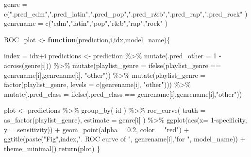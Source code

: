 \documentclass[
]{article}
\newenvironment{Shaded}{\begin{snugshade}}{\end{snugshade}}
\newcommand{\AttributeTok}[1]{\textcolor[rgb]{0.77,0.63,0.00}{#1}}
\newcommand{\ControlFlowTok}[1]{\textcolor[rgb]{0.13,0.29,0.53}{\textbf{#1}}}
\newcommand{\DecValTok}[1]{\textcolor[rgb]{0.00,0.00,0.81}{#1}}
\newcommand{\FloatTok}[1]{\textcolor[rgb]{0.00,0.00,0.81}{#1}}
\newcommand{\FunctionTok}[1]{\textcolor[rgb]{0.00,0.00,0.00}{#1}}
\newcommand{\NormalTok}[1]{#1}
\newcommand{\OtherTok}[1]{\textcolor[rgb]{0.56,0.35,0.01}{#1}}
\newcommand{\SpecialCharTok}[1]{\textcolor[rgb]{0.00,0.00,0.00}{#1}}
\newcommand{\StringTok}[1]{\textcolor[rgb]{0.31,0.60,0.02}{#1}}
\begin{document}
\begin{Shaded}
\begin{Highlighting}[]
\NormalTok{genre }\OtherTok{=} \FunctionTok{c}\NormalTok{(}\StringTok{".pred\_edm"}\NormalTok{,}\StringTok{".pred\_latin"}\NormalTok{,}\StringTok{".pred\_pop"}\NormalTok{,}\StringTok{".pred\_r\&b"}\NormalTok{,}\StringTok{".pred\_rap"}\NormalTok{,}\StringTok{".pred\_rock"}\NormalTok{ )}
\NormalTok{genrename }\OtherTok{=} \FunctionTok{c}\NormalTok{(}\StringTok{"edm"}\NormalTok{,}\StringTok{"latin"}\NormalTok{,}\StringTok{"pop"}\NormalTok{,}\StringTok{"r\&b"}\NormalTok{,}\StringTok{"rap"}\NormalTok{,}\StringTok{"rock"}\NormalTok{ )}

\NormalTok{ROC\_plot }\OtherTok{\textless{}{-}} \ControlFlowTok{function}\NormalTok{(prediction,i,idx,model\_name)\{}
  
\NormalTok{  index }\OtherTok{=}\NormalTok{ idx}\SpecialCharTok{+}\NormalTok{i}
\NormalTok{  predictions }\OtherTok{\textless{}{-}} 
\NormalTok{  prediction }\SpecialCharTok{\%\textgreater{}\%} 
  \FunctionTok{mutate}\NormalTok{(}\AttributeTok{.pred\_other =} \DecValTok{1} \SpecialCharTok{{-}} \FunctionTok{across}\NormalTok{(genre[i])) }\SpecialCharTok{\%\textgreater{}\%} 
  \FunctionTok{mutate}\NormalTok{(}\AttributeTok{playlist\_genre =} \FunctionTok{ifelse}\NormalTok{(playlist\_genre }\SpecialCharTok{==}\NormalTok{ genrename[i],genrename[i], }\StringTok{"other"}\NormalTok{)) }\SpecialCharTok{\%\textgreater{}\%} 
  \FunctionTok{mutate}\NormalTok{(}\AttributeTok{playlist\_genre =} \FunctionTok{factor}\NormalTok{(playlist\_genre, }\AttributeTok{levels =} \FunctionTok{c}\NormalTok{(genrename[i], }\StringTok{"other"}\NormalTok{))) }\SpecialCharTok{\%\textgreater{}\%} 
  \FunctionTok{mutate}\NormalTok{(}\AttributeTok{.pred\_class =} \FunctionTok{ifelse}\NormalTok{(.pred\_class }\SpecialCharTok{==}\NormalTok{ genrename[i],genrename[i],}\StringTok{"other"}\NormalTok{))}

\NormalTok{  plot }\OtherTok{\textless{}{-}}\NormalTok{ predictions }\SpecialCharTok{\%\textgreater{}\%} \FunctionTok{group\_by}\NormalTok{( id ) }\SpecialCharTok{\%\textgreater{}\%} 
  \FunctionTok{roc\_curve}\NormalTok{( }\AttributeTok{truth =} \FunctionTok{as\_factor}\NormalTok{(playlist\_genre), }\AttributeTok{estimate =}\NormalTok{ genre[i] ) }\SpecialCharTok{\%\textgreater{}\%} 
    \FunctionTok{ggplot}\NormalTok{(}\FunctionTok{aes}\NormalTok{(}\AttributeTok{x=} \DecValTok{1}\SpecialCharTok{{-}}\NormalTok{specificity, }\AttributeTok{y =}\NormalTok{ sensitivity)) }\SpecialCharTok{+} \FunctionTok{geom\_point}\NormalTok{(}\AttributeTok{alpha =} \FloatTok{0.2}\NormalTok{, }\AttributeTok{color =} \StringTok{"red"}\NormalTok{) }\SpecialCharTok{+}
    \FunctionTok{ggtitle}\NormalTok{(}\FunctionTok{paste}\NormalTok{(}\StringTok{"Fig"}\NormalTok{,index,}\StringTok{". ROC curve of "}\NormalTok{, genrename[i],}\StringTok{"for "}\NormalTok{, model\_name)) }\SpecialCharTok{+} \FunctionTok{theme\_minimal}\NormalTok{()}
 \FunctionTok{return}\NormalTok{(plot)}
\NormalTok{\}}


\end{Highlighting}
\end{Shaded}
\end{document}
